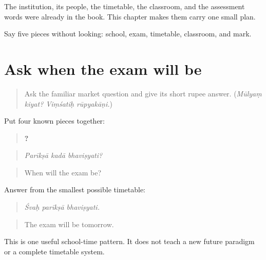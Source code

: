 \begin{grammarlens}[title={What you've built}]
The institution, its people, the timetable, the classroom, and the assessment words were already in the book. This chapter makes them carry one small plan.
\end{grammarlens}

\begin{tcolorbox}[breakable,colback=teal!4,colframe=teal!35!black,title={Before you move on}]
Say five pieces without looking: school, exam, timetable, classroom, and mark.
\end{tcolorbox}
\section[(ask when an exam will be)]{Ask when the exam will be}

\label{lesson:SA-C267-exam-time}



\begin{quote}
Ask the familiar market question and give its short rupee answer. (\emph{Mūlyaṃ kiyat? Viṃśatiḥ rūpyakāṇi.})
\end{quote}

\begin{grammarlens}[title={Grammar Lens: one timetable turn}]
Put four known pieces together:

\begin{quote}
\textbf{  ?}
\end{quote}

\begin{quote}
\emph{Parīkṣā kadā bhaviṣyati?}
\end{quote}

\begin{quote}
When will the exam be?
\end{quote}

Answer from the smallest possible timetable:

\begin{quote}
\textbf{  }
\end{quote}

\begin{quote}
\emph{Śvaḥ parīkṣā bhaviṣyati.}
\end{quote}

\begin{quote}
The exam will be tomorrow.
\end{quote}

This is one useful school-time pattern. It does not teach a new future paradigm or a complete timetable system.
\end{grammarlens}

